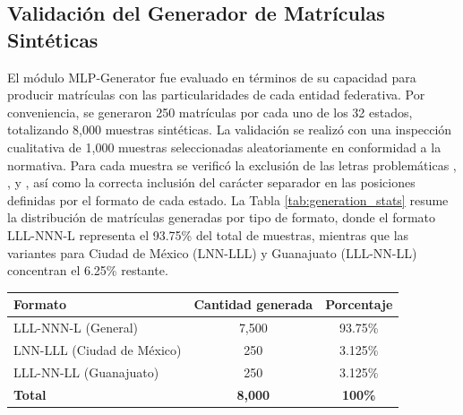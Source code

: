\subsection*{Validación del Generador de Matrículas Sintéticas}
El módulo MLP-Generator fue evaluado en términos de su capacidad para producir matrículas con las particularidades de cada entidad federativa. Por conveniencia, se generaron 250 matrículas por cada uno de los 32 estados, totalizando 8,000 muestras sintéticas. La validación se realizó con una inspección cualitativa de 1,000 muestras seleccionadas aleatoriamente en conformidad a la normativa. Para cada muestra se verificó la exclusión de las letras problemáticas , ,  y , así como la correcta inclusión del carácter separador \quotes{-} en las posiciones definidas por el formato de cada estado. La Tabla \ref{tab:generation_stats} resume la distribución de matrículas generadas por tipo de formato, donde el formato LLL-NNN-L representa el 93.75\% del total de muestras, mientras que las variantes para Ciudad de México (LNN-LLL) y Guanajuato (LLL-NN-LL) concentran el 6.25\% restante.

\sffamily
\footnotesize
{}
\begin{center}
\begin{tcolorbox}[
  colback=white,
  colframe=MASA-Blue,
  title={Tabla~\thetable~Distribución de matrículas generadas por tipo de formato},
  boxrule=0.5mm,
  arc=2mm,
  width=12cm,%
  enhanced,
  fonttitle=\bfseries,
  before upper=\vspace{2mm},
  after upper=\vspace{2mm}
]
\label{tab:generation_stats}
\renewcommand{\arraystretch}{1.5}
\begin{tabularx}{\textwidth}{@{}l c c@{}}
\textbf{Formato} & \textbf{Cantidad generada} & \textbf{Porcentaje} \\
\midrule
LLL-NNN-L (General) & 7,500 & 93.75\% \\
LNN-LLL (Ciudad de México) & 250 & 3.125\% \\
LLL-NN-LL (Guanajuato) & 250 & 3.125\% \\
\midrule
\textbf{Total} & \textbf{8,000} & \textbf{100\%} \\
\end{tabularx}
\end{tcolorbox}
\end{center}
\normalsize
\normalfont


